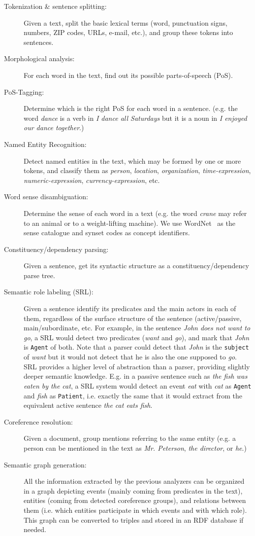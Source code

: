 \begin{description}
\item[Tokenization \& sentence splitting:] Given a text, split the basic lexical
  terms (word, punctuation signs, numbers, ZIP codes, URLs, e-mail, etc.), and
  group these tokens into sentences.
\item[Morphological analysis:] For each word in the text, find out its possible
  parts-of-speech (PoS).
\item[PoS-Tagging:] Determine which is the right PoS for each word in a
  sentence. (e.g. the word \textit{dance} is a verb in \textit{I dance all
    Saturdays} but it is a noun in \textit{I enjoyed our dance together}.)
\item[Named Entity Recognition:] Detect named entities in the text, which may be
  formed by one or more tokens, and classify them as \textit{person},
  \textit{location}, \textit{organization}, \textit{time-expression},
  \textit{numeric-expression}, \textit{currency-expression}, etc.
\item[Word sense disambiguation:] Determine the sense of each word in a text
  (e.g. the word \textit{crane} may refer to an animal or to a weight-lifting
  machine). We use WordNet~\cite{fellbaum98} as the sense catalogue and synset
  codes as concept identifiers.
\item[Constituency/dependency parsing:] Given a sentence, get its syntactic
  structure as a constituency/dependency parse tree.
\item[Semantic role labeling (SRL):] Given a sentence identify its predicates and the
  main actors in each of them, regardless of the surface structure of the
  sentence (active/passive, main/subordinate, etc. For example, in the sentence
  \textit{John does not want to go}, a SRL would detect two predicates
  (\textit{want} and \textit{go}), and mark that \textit{John} is \texttt{Agent}
  of both. Note that a parser could detect that \textit{John} is the
  \texttt{subject} of \textit{want} but it would not detect that he is also the
  one supposed to \textit{go}.  SRL provides a higher level of abstraction than
  a parser, providing slightly deeper semantic knowledge. E.g. in a passive
  sentence such as \textit{the fish was eaten by the cat}, a SRL system would
  detect an event \textit{eat} with \textit{cat} as \texttt{Agent} and
  \textit{fish} as \texttt{Patient}, i.e. exactly the same that it would extract
  from the equivalent active sentence \textit{the cat eats fish}.
\item[Coreference resolution:] Given a document, group mentions referring to the same entity (e.g. a person can be mentioned in the text as \textit{Mr. Peterson}, \textit{the director}, or \textit{he}.) 
\item[Semantic graph generation:] All the information extracted by the previous
  analyzers can be organized in a graph depicting events (mainly coming from
  predicates in the text), entities (coming from detected coreference groups),
  and relations between them (i.e. which entities participate in which events
  and with which role). This graph can be converted to triples and stored in an
  RDF database if needed.
\end{description}

